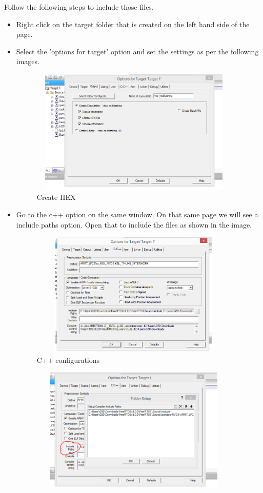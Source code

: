 \documentclass{article}
\begin{document}
\begin{enumerate}
Follow the following steps to include those files.
\begin{itemize}
    \item Right click on the target folder that is created on the left hand side of the page.
    \item Select the 'options for target' option and set the settings as per the following images.
    \begin{figure}[h]
\centering
\includegraphics[width=10cm,height=6cm]{Capture.PNG}
\caption{Create HEX}
\end{figure}
\item Go to the c++ option on the same window. On that same page we will see a include paths option. Open that to include the files as shown in the image.
\begin{figure}[H]
\centering
\includegraphics[width=10cm,height=6cm]{c++.PNG}
\caption{C++ configurations}
\end{figure}
\begin{figure}[H]
\centering
\includegraphics[width=10cm,height=6cm]{c++foldersetup.PNG}

\end{figure}
\end{itemize}
\end{enumerate}
\end{document}
